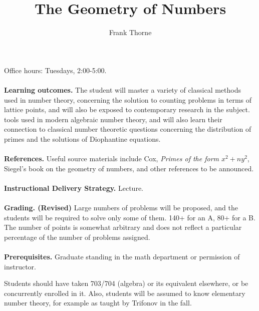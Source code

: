 \documentclass[11pt]{amsart}
\theoremstyle{remark}
\numberwithin{theorem}{section} \numberwithin{equation}{section}
\begin{document}
\title[The Geometry of Numbers]
{The Geometry of Numbers}
\author{Frank Thorne}
\address{Department of Mathematics, University of South Carolina,
1523 Greene Street, Columbia, SC 29208}

\maketitle
Office hours: Tuesdays, 2:00-5:00.
\\
\\
{\bf Learning outcomes.} The student will master a variety of classical methods used in
number theory, concerning the solution to counting problems in terms of lattice points, 
and will also be exposed to contemporary research in the subject.
tools used in modern algebraic number theory, and will also
learn their connection to classical number theoretic questions concerning the distribution of primes and the solutions of
Diophantine equations.
\\
\\
{\bf References.} Useful source materials include Cox, {\itshape Primes of the form
$x^2 + ny^2$}, Siegel's book on the geometry of numbers, and other references to be announced.
\\
\\
{\bf Instructional Delivery Strategy.} Lecture.
\\
\\
{\bf Grading. (Revised)} Large numbers of problems will be proposed, and the students will be required
to solve only some of them. 140+ for an A, 80+ for a B.
The number of points is somewhat arbitrary and does not reflect a particular percentage
of the number of problems assigned.
\\
\\
{\bf Prerequisites.} Graduate standing in the math department or permission of instructor. 

Students should have taken 703/704 (algebra) or its equivalent elsewhere, or be concurrently enrolled in it. Also, students will be assumed to know elementary number theory, for example
as taught by Trifonov in the fall.
\end{document}
